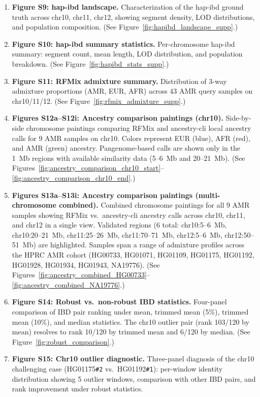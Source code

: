 \documentclass[11pt]{article}
\begin{document}
\begin{enumerate}
    \item \textbf{Figure S9: hap-ibd landscape.} Characterization of the hap-ibd ground truth across chr10, chr11, chr12, showing segment density, LOD distributions, and population composition. (See Figure~\ref{fig:hapibd_landscape_supp}.)

    \item \textbf{Figure S10: hap-ibd summary statistics.} Per-chromosome hap-ibd summary: segment count, mean length, LOD distribution, and population breakdown. (See Figure~\ref{fig:hapibd_stats_supp}.)

    \item \textbf{Figure S11: RFMix admixture summary.} Distribution of 3-way admixture proportions (AMR, EUR, AFR) across 43 AMR query samples on chr10/11/12. (See Figure~\ref{fig:rfmix_admixture_supp}.)

    \item \textbf{Figures S12a--S12i: Ancestry comparison paintings (chr10).} Side-by-side chromosome paintings comparing RFMix and ancestry-cli local ancestry calls for 9 AMR samples on chr10. Colors represent EUR (blue), AFR (red), and AMR (green) ancestry. Pangenome-based calls are shown only in the 1~Mb regions with available similarity data (5--6~Mb and 20--21~Mb). (See Figures~\ref{fig:ancestry_comparison_chr10_start}--\ref{fig:ancestry_comparison_chr10_end}.)

    \item \textbf{Figures S13a--S13i: Ancestry comparison paintings (multi-chromosome combined).} Combined chromosome paintings for all 9 AMR samples showing RFMix vs.\ ancestry-cli ancestry calls across chr10, chr11, and chr12 in a single view. Validated regions (6 total: chr10:5--6~Mb, chr10:20--21~Mb, chr11:25--26~Mb, chr11:70--71~Mb, chr12:5--6~Mb, chr12:50--51~Mb) are highlighted. Samples span a range of admixture profiles across the HPRC AMR cohort (HG00733, HG01071, HG01109, HG01175, HG01192, HG01928, HG01934, HG01943, NA19776). (See Figures~\ref{fig:ancestry_combined_HG00733}--\ref{fig:ancestry_combined_NA19776}.)

    \item \textbf{Figure S14: Robust vs.\ non-robust IBD statistics.} Four-panel comparison of IBD pair ranking under mean, trimmed mean (5\%), trimmed mean (10\%), and median statistics. The chr10 outlier pair (rank 103/120 by mean) resolves to rank 10/120 by trimmed mean and 6/120 by median. (See Figure~\ref{fig:robust_comparison}.)

    \item \textbf{Figure S15: Chr10 outlier diagnostic.} Three-panel diagnosis of the chr10 challenging case (HG01175\texttt{\#2} vs.\ HG01192\texttt{\#1}): per-window identity distribution showing 5 outlier windows, comparison with other IBD pairs, and rank improvement under robust statistics.


\end{enumerate}
\end{document}
